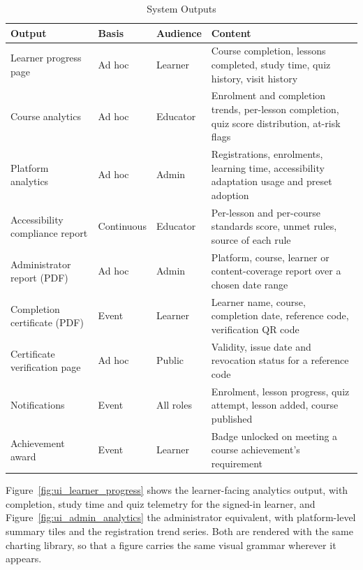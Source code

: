 \documentclass[12pt, oneside]{article} %
\newcommand{\tabbreak}{\hyphenpenalty=200\exhyphenpenalty=200\tolerance=4000\hbadness=10000\hspace{0pt}}
\begin{document}
\begin{table}[H]
\caption{System Outputs}
\label{tab:output_design}
\vspace{-4mm}
\begin{center}
\renewcommand{\arraystretch}{1.2}
\footnotesize
\begin{tabular}{|>{\raggedright\arraybackslash\tabbreak}p{3.32cm}|>{\raggedright\arraybackslash\tabbreak}p{1.99cm}|>{\raggedright\arraybackslash\tabbreak}p{2.0cm}|>{\raggedright\arraybackslash\tabbreak}p{5.59cm}|}
\hline
\textbf{Output} & \textbf{Basis} & \textbf{Audience} & \textbf{Content} \\
\hline \hline
Learner progress page & Ad hoc & Learner & Course completion, lessons completed, study time, quiz history, visit history \\ \hline
Course analytics & Ad hoc & Educator & Enrolment and completion trends, per-lesson completion, quiz score distribution, at-risk flags \\ \hline
Platform analytics & Ad hoc & Admin & Registrations, enrolments, learning time, accessibility adaptation usage and preset adoption \\ \hline
Accessibility compliance report & Continuous & Educator & Per-lesson and per-course standards score, unmet rules, source of each rule \\ \hline
Administrator report (PDF) & Ad hoc & Admin & Platform, course, learner or content-coverage report over a chosen date range \\ \hline
Completion certificate (PDF) & Event & Learner & Learner name, course, completion date, reference code, verification QR code \\ \hline
Certificate verification page & Ad hoc & Public & Validity, issue date and revocation status for a reference code \\ \hline
Notifications & Event & All roles & Enrolment, lesson progress, quiz attempt, lesson added, course published \\ \hline
Achievement award & Event & Learner & Badge unlocked on meeting a course achievement's requirement \\ \hline
\end{tabular}
\end{center}
\end{table}

Figure~\ref{fig:ui_learner_progress} shows the learner-facing analytics output, with completion, study time and quiz telemetry for the signed-in learner, and Figure~\ref{fig:ui_admin_analytics} the administrator equivalent, with platform-level summary tiles and the registration trend series. Both are rendered with the same charting library, so that a figure carries the same visual grammar wherever it appears.
\end{document}

